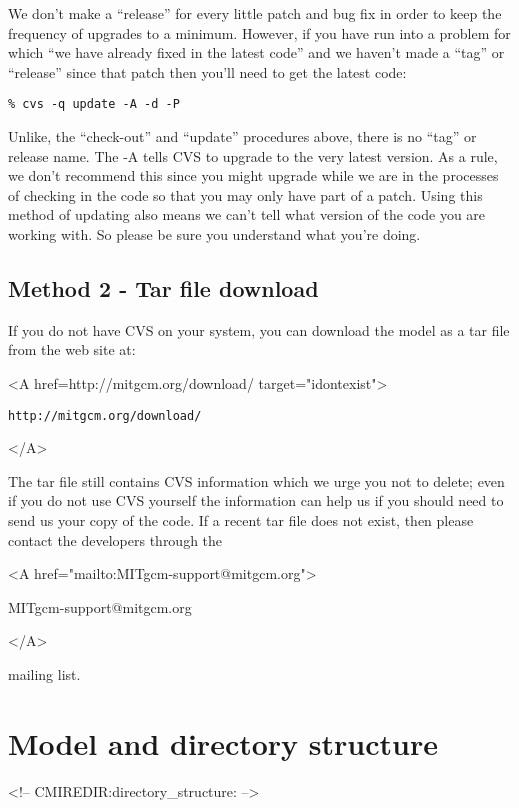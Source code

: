 We don't make a ``release'' for every little patch and bug fix in
order to keep the frequency of upgrades to a minimum. However, if you
have run into a problem for which ``we have already fixed in the
latest code'' and we haven't made a ``tag'' or ``release'' since that
patch then you'll need to get the latest code:
\begin{verbatim}
% cvs -q update -A -d -P
\end{verbatim}
Unlike, the ``check-out'' and ``update'' procedures above, there is no
``tag'' or release name. The -A tells CVS to upgrade to the
very latest version. As a rule, we don't recommend this since you
might upgrade while we are in the processes of checking in the code so
that you may only have part of a patch. Using this method of updating
also means we can't tell what version of the code you are working
with. So please be sure you understand what you're doing.

\subsection{Method 2 - Tar file download}
\label{sect:conventionalDownload}

If you do not have CVS on your system, you can download the model as a
tar file from the web site at:
\begin{rawhtml} <A href=http://mitgcm.org/download/ target="idontexist"> \end{rawhtml}
\begin{verbatim}
http://mitgcm.org/download/
\end{verbatim}
\begin{rawhtml} </A> \end{rawhtml}
The tar file still contains CVS information which we urge you not to
delete; even if you do not use CVS yourself the information can help
us if you should need to send us your copy of the code.  If a recent
tar file does not exist, then please contact the developers through
the 
\begin{rawhtml} <A href="mailto:MITgcm-support@mitgcm.org"> \end{rawhtml}
MITgcm-support@mitgcm.org
\begin{rawhtml} </A> \end{rawhtml}
mailing list.

\section{Model and directory structure}
\begin{rawhtml}
<!-- CMIREDIR:directory_structure: -->
\end{rawhtml}

